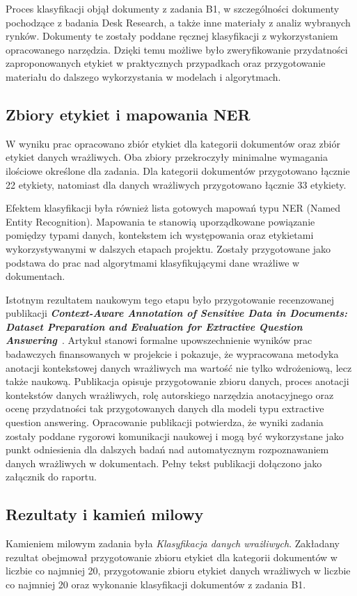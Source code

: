 \documentclass[12pt,a4paper]{report}
\begin{document}
Proces klasyfikacji objął dokumenty z zadania B1, w szczególności dokumenty pochodzące z badania Desk Research, a także inne materiały z analiz wybranych rynków. Dokumenty te zostały poddane ręcznej klasyfikacji z wykorzystaniem opracowanego narzędzia. Dzięki temu możliwe było zweryfikowanie przydatności zaproponowanych etykiet w praktycznych przypadkach oraz przygotowanie materiału do dalszego wykorzystania w modelach i algorytmach.

\subsection{Zbiory etykiet i mapowania NER}
W wyniku prac opracowano zbiór etykiet dla kategorii dokumentów oraz zbiór etykiet danych wrażliwych. Oba zbiory przekroczyły minimalne wymagania ilościowe określone dla zadania. Dla kategorii dokumentów przygotowano łącznie 22 etykiety, natomiast dla danych wrażliwych przygotowano łącznie 33 etykiety.

Efektem klasyfikacji była również lista gotowych mapowań typu NER (Named Entity Recognition). Mapowania te stanowią uporządkowane powiązanie pomiędzy typami danych, kontekstem ich występowania oraz etykietami wykorzystywanymi w dalszych etapach projektu. Zostały przygotowane jako podstawa do prac nad algorytmami klasyfikującymi dane wrażliwe w dokumentach.

Istotnym rezultatem naukowym tego etapu było przygotowanie recenzowanej publikacji \textit{\textbf{Context-Aware Annotation of Sensitive Data in Documents: Dataset Preparation and Evaluation for Extractive Question Answering}}~\cite{legumina2025contextawareannotation}. Artykuł stanowi formalne upowszechnienie wyników prac badawczych finansowanych w projekcie i pokazuje, że wypracowana metodyka anotacji kontekstowej danych wrażliwych ma wartość nie tylko wdrożeniową, lecz także naukową. Publikacja opisuje przygotowanie zbioru danych, proces anotacji kontekstów danych wrażliwych, rolę autorskiego narzędzia anotacyjnego oraz ocenę przydatności tak przygotowanych danych dla modeli typu extractive question answering. Opracowanie publikacji potwierdza, że wyniki zadania zostały poddane rygorowi komunikacji naukowej i mogą być wykorzystane jako punkt odniesienia dla dalszych badań nad automatycznym rozpoznawaniem danych wrażliwych w dokumentach. Pełny tekst publikacji dołączono jako załącznik do raportu.

\subsection{Rezultaty i kamień milowy}
Kamieniem milowym zadania była \textit{Klasyfikacja danych wrażliwych}. Zakładany rezultat obejmował przygotowanie zbioru etykiet dla kategorii dokumentów w liczbie co najmniej 20, przygotowanie zbioru etykiet danych wrażliwych w liczbie co najmniej 20 oraz wykonanie klasyfikacji dokumentów z zadania B1.
\end{document}

